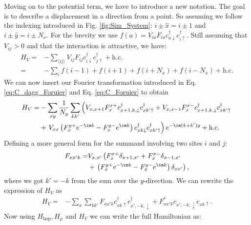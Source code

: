 \documentclass[../main.tex]{subfile}
\begin{document}
Moving on to the potential term, we have to introduce a new notation. The goal is to describe a displacement in a direction from a point. So assuming
we follow the indexing introduced in Fig. \ref{fig:Sim_System}: $i\pm\hat{x} = i\pm 1$ and $i\pm\hat{y} = i\pm N_x$.
For the brevity we use $f(a) = V_{ia}F_{ia} c^{\dagger}_{a\downarrow} c^{\dagger}_{i\uparrow}$. Still assuming that $V_{ij}>0$ and that the interaction is attractive, we have:
\begin{align*}
    H_V =& -\sum_{\langle ij\rangle} V_{ij} F_{ij} c^{\dagger}_{i\downarrow} c^{\dagger}_{j\uparrow} + \text{h.c.} \\
    =& -\sum_{i} f(i-1) + f(i+1) + f(i+N_x) + f(i-N_x) + \text{h.c.}
\end{align*}
We can now insert our Fourier transformation introduced in Eq. \ref{eq:C_dagg_Foruier} and Eq. \ref{eq:C_Foruier} to obtain
\begin{align*}
    H_V =& -\sum_{xy} \frac{1}{N_y} \sum_{kk'} \left( V_{x,x+1} F_{x}^{x+} c^{\dagger}_{x+1,k,\downarrow}c^{\dagger}_{xk'\uparrow} + V_{x,x-1} F_{x}^{x-} c^{\dagger}_{x+1,k,\downarrow} c^{\dagger}_{xk'\uparrow} \right.\\
        &+ \left.V_{xx}\left( F_{x}^{y+} e^{-\im k}  - F_{x}^{y-} e^{\im k}\right) c^{\dagger}_{xk\downarrow} c^{\dagger}_{xk'\uparrow} \right) e^{-\im(k + k')y} + \text{h.c.}\\
\end{align*}
Defining a more general form for the summand involving two sites $i$ and $j$:
\begin{equation*}
    \begin{aligned}
    F_{xx'k} =&  V_{x,x'}\left( F_{x}^{x+} \delta_{x+1,x'} +  F_{x}^{x-} \delta_{x-1,x'}\right. \\
        &+ \left.\left( F_{x}^{y+} e^{-\im k}  - F_{x}^{y-} e^{\im k}\right)\delta_{xx'}\right),
    \end{aligned}
\end{equation*} 
where we got $k' = -k$ from the sum over the $y$-direction. We can rewrite the expression of $H_V$ as
\begin{align*}
    H_V =& -\sum_{x} \sum_{kk'} F_{xx'k} c^{\dagger}_{xk\uparrow} c^{\dagger}_{x',-k,\downarrow} + F_{xx'k}^{\ast} c_{x',-k,\downarrow} c_{xk\uparrow}.
\end{align*}
Now using $H_{\text{hop}}, H_{\mu}$ and $H_{V}$ we can write the full Hamiltonian as:
\end{document}
